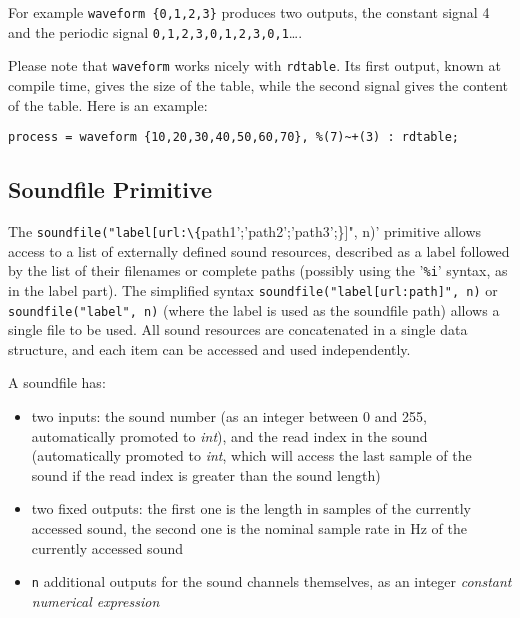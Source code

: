 For example \lstinline'waveform {0,1,2,3}' produces two outputs, the constant signal 4 and the periodic signal \lstinline'0,1,2,3,0,1,2,3,0,1'\ldots.

Please note that \lstinline'waveform' works nicely with \lstinline'rdtable'. Its first output, known at compile time, gives the size of the table, while the second signal gives the content of the table. Here is an example:
\begin{lstlisting}
process = waveform {10,20,30,40,50,60,70}, %(7)~+(3) : rdtable;
\end{lstlisting}

\bigskip

\subsection{Soundfile Primitive}

The \lstinline'soundfile("label[url:\{'path1';'path2';'path3';\}]", n)' primitive allows access to a list of externally defined sound resources, described as a label followed by the list of their filenames or complete paths (possibly using the '\texttt{\%i}' syntax, as in the label part). The simplified syntax \lstinline'soundfile("label[url:path]", n)' or \lstinline'soundfile("label", n)' (where the label is used as the soundfile path) allows a single file to be used. All sound resources are concatenated in a single data structure, and each item can be accessed and used independently.

A soundfile has:

\begin{itemize}
	\item two inputs: the sound number (as an integer between 0 and 255, automatically promoted to \textit{int}), and the read index in the sound (automatically promoted to \textit{int}, which will access the last sample of the sound if the read index is greater than the sound length)
	\item two fixed outputs: the first one is the length in samples of the currently accessed sound, the second one is the nominal sample rate in Hz of the currently accessed sound
	\item \lstinline'n' additional outputs for the sound channels themselves, as an integer \textit{constant numerical expression}
\end{itemize}

